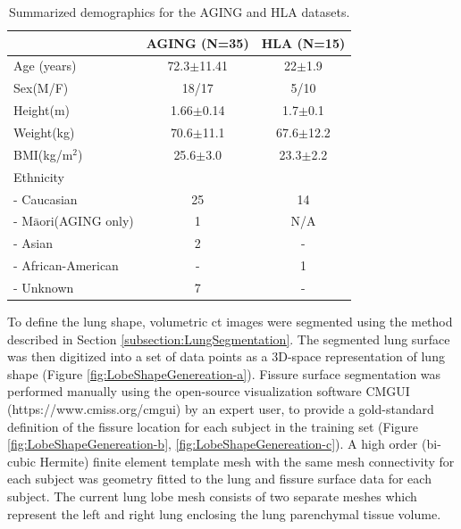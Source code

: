 \begin{table}[htbp]
\centering
\caption{Summarized demographics for the AGING and HLA datasets.}
\label{tab:SSMSubjects}
\begin{tabular}{l c c}
\hline
  & AGING (N=35) & HLA (N=15)\\ 
\hline
Age (years) & 72.3$ \pm $11.41 &  22$ \pm $1.9\\
Sex(M/F) & 18/17 & 5/10\\
Height(m) & 1.66$ \pm $0.14 &	1.7$ \pm $0.1\\
Weight(kg) & 70.6$ \pm $11.1 &	67.6$ \pm $12.2\\
BMI(kg/$\mathrm{m^{2}}$) & 25.6$ \pm $3.0 &	23.3$ \pm $2.2\\
\hline
Ethnicity\\
- Caucasian & 25 &	14\\
- M$\mathrm{\bar{a}}$ori(AGING only) & 1 &	N/A\\
- Asian & 2 &	-\\
- African-American & - &	1\\
 - Unknown & 7 &	-\\
\hline
\end{tabular}
\end{table}

To define the lung shape, volumetric \gls{ct} images were segmented using the method described in Section \ref{subsection:LungSegmentation}. The segmented lung surface was then digitized into a set of data points as a 3D-space representation of lung shape (Figure \ref{fig:LobeShapeGenereation-a}). Fissure surface segmentation was performed manually using the open-source visualization software CMGUI (https://www.cmiss.org/cmgui) by an expert user, to provide a gold-standard definition of the fissure location for each subject in the training set (Figure \ref{fig:LobeShapeGenereation-b}, \ref{fig:LobeShapeGenereation-c}). A high order (bi-cubic Hermite) finite element template mesh with the same mesh connectivity for each subject was geometry fitted to the lung and fissure surface data for each subject. The current lung lobe mesh consists of two separate meshes which represent the left and right lung enclosing the lung parenchymal tissue volume. 

